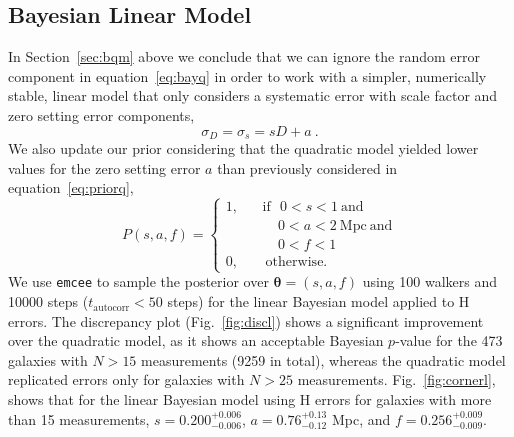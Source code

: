 \documentclass[a4paper,fleqn,usenatbib]{mnras}
\begin{document}
\subsection{Bayesian Linear Model}
\label{sec:blm}
In Section~\ref{sec:bqm} above we conclude that we can ignore the random error component in equation~\ref{eq:bayq} in order to work with a simpler, numerically stable, linear model that only considers a systematic error with scale factor and zero setting error components,
\begin{equation}
\sigma_D=\sigma_s=sD+a\ .
	\label{eq:bayl}
\end{equation}
We also update our prior considering that the quadratic model yielded lower values for the zero setting error $a$ than previously considered in equation~\ref{eq:priorq},
\begin{equation}
P(s,a,f)=\left\{
\begin{aligned}
1,\ \ \ \ &\mathrm{if}\ \ \ 0<s<1\ \mathrm{and}\\
& \ \ \ \ \  0<a<2\ \mathrm{Mpc}\ \mathrm{and}\\
& \ \ \ \ \  0<f<1\\
0,\ \ \ \ &\ \mathrm{otherwise.}
\end{aligned}
\right.
\end{equation}
We use \texttt{emcee} to sample the posterior over $\pmb{\theta}=(s,a,f)$ using 100 walkers and 10000 steps ($t_\mathrm{autocorr} < 50$ steps) for the linear Bayesian model applied to H errors. The discrepancy plot (Fig.~\ref{fig:discl}) shows a significant improvement over the quadratic model, as it shows an acceptable Bayesian $p$-value for the 473 galaxies with $N>15$ measurements (9259 in total), whereas the quadratic model replicated errors only for galaxies with $N>25$ measurements. Fig.~\ref{fig:cornerl}, shows that for the linear Bayesian model using H errors for galaxies with more than 15 measurements, $s=0.200_{-0.006}^{+0.006}$, $a=0.76_{-0.12}^{+0.13}$ Mpc, and $f=0.256_{-0.009}^{+0.009}$.
\end{document}
